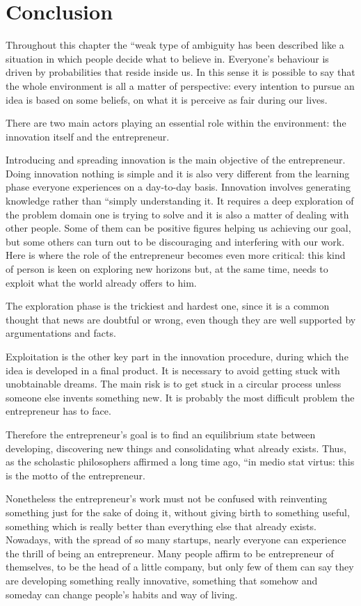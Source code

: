 \section{Conclusion}
Throughout this chapter the ``weak type of ambiguity has been described like a situation in which people decide what to believe in. Everyone’s behaviour is driven by probabilities that reside inside us. In this sense it is possible to say that the whole environment is all a matter of perspective: every intention to pursue an idea is based on some beliefs, on what it is perceive as fair during our lives.

There are two main actors playing an essential role within the environment: the innovation itself and the entrepreneur.

Introducing and spreading innovation is the main objective of the entrepreneur. Doing innovation nothing is simple and it is also very different from the learning phase everyone experiences on a day-to-day basis. Innovation involves generating knowledge rather than ``simply understanding it. It requires a deep exploration of the problem domain one is trying to solve and it is also a matter of dealing with other people. Some of them can be positive figures helping us achieving our goal, but some others can turn out to be discouraging and interfering with our work.
Here is where the role of the entrepreneur becomes even more critical: this kind of person is keen on exploring new horizons but, at the same time, needs to exploit what the world already offers to him.

The exploration phase is the trickiest and hardest one, since it is a common thought that news are doubtful or wrong, even though they are well supported by argumentations and facts.

Exploitation is the other key part in the innovation procedure, during which the idea is developed in a final product. It is necessary to avoid getting stuck with unobtainable dreams. The main risk is to get stuck in a circular process unless someone else invents something new. It is probably the most difficult problem the entrepreneur has to face.

Therefore the entrepreneur’s goal is to find an equilibrium state between developing, discovering new things and consolidating what already exists. Thus, as the scholastic philosophers affirmed a long time ago, ``in medio stat virtus: this is the motto of the entrepreneur.

Nonetheless the entrepreneur’s work must not be confused with reinventing something just for the sake of doing it, without giving birth to something useful, something which is really better than everything else that already exists. Nowadays, with the spread of so many startups, nearly everyone can experience the thrill of being an entrepreneur. Many people affirm to be entrepreneur of themselves, to be the head of a little company, but only few of them can say  they are developing something really innovative, something that somehow and someday can change people's habits and way of living.

